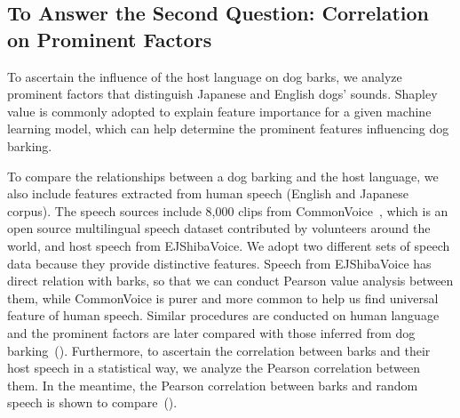 \subsection{To Answer the Second Question: Correlation on Prominent Factors}
To ascertain the influence of the host language on dog barks, we analyze prominent factors 
that distinguish Japanese and English dogs' sounds. Shapley value is commonly adopted 
to explain feature importance for a given machine learning model, which can help 
determine the prominent features influencing dog barking. %




To compare the relationships between a dog barking and the host language, 
we also include features extracted from human speech (English and Japanese corpus). 
The speech sources include 8,000 clips from CommonVoice~\cite{ardila2019common}, 
which is an open source multilingual speech dataset contributed by volunteers around 
the world, and host speech from EJShibaVoice. We adopt two different sets of speech data 
because they provide distinctive features. 
Speech from EJShibaVoice has direct relation with barks, 
so that we can conduct Pearson value analysis between them, 
while CommonVoice is purer and more common to help us find universal 
feature of human speech. Similar procedures are conducted on human language 
and the prominent factors are later compared with those inferred 
from dog barking~().
Furthermore, to ascertain the correlation between barks and their host speech in a statistical way, we analyze the Pearson correlation between them. In the meantime, the Pearson correlation between barks and random speech is shown to compare~().
